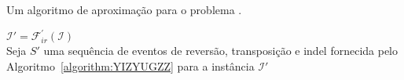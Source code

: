 \begin{algorithm}[!tbh]
  \caption{Um algoritmo de aproximação para o problema \SbFIRTI{}.\label{algorithm:JSNLHIVA}}
  $\mathcal{I}' = \mathcal{F}_{ir}^{'}(\mathcal{I})$ \\
  Seja $S'$ uma sequência de eventos de reversão, transposição e indel fornecida pelo Algoritmo~\ref{algorithm:YIZYUGZZ} para a instância $\mathcal{I}'$ \\
\end{algorithm}